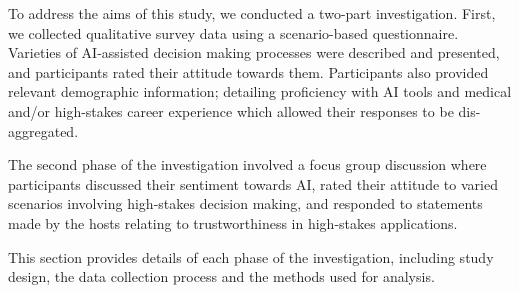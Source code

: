 \documentclass[manuscript,screen,review]{acmart}
\begin{document}
To address the aims of this study, we conducted a two-part investigation. First, we collected qualitative survey data using a scenario-based questionnaire. Varieties of AI-assisted decision making processes were described and presented, and participants rated their attitude towards them. Participants also provided relevant demographic information; detailing proficiency with AI tools and medical and/or high-stakes career experience which allowed their responses to be dis-aggregated.

The second phase of the investigation involved a focus group discussion where participants discussed their sentiment towards AI, rated their attitude to varied scenarios involving high-stakes decision making, and responded to statements made by the hosts relating to trustworthiness in high-stakes applications.

This section provides details of each phase of the investigation, including study design, the data collection process and the methods used for analysis.

\end{document}
